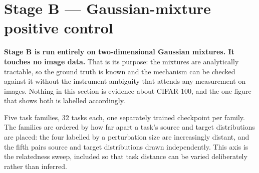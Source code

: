 \documentclass{article}
\begin{document}
\section{Stage B --- Gaussian-mixture positive control}

\textbf{Stage B is run entirely on two-dimensional Gaussian mixtures. It touches no image
data.} That is its purpose: the mixtures are analytically tractable, so the ground truth is
known and the mechanism can be checked against it without the instrument ambiguity that
attends any measurement on images. Nothing in this section is evidence about CIFAR-100, and
the one figure that shows both is labelled accordingly.

Five task families, 32 tasks each, one separately trained checkpoint per family. The
families are ordered by how far apart a task's source and target distributions are placed:
the four labelled by a perturbation size are increasingly distant, and the fifth pairs
source and target distributions drawn independently. This axis is the relatedness sweep,
included so that task distance can be varied deliberately rather than inferred.
\end{document}
